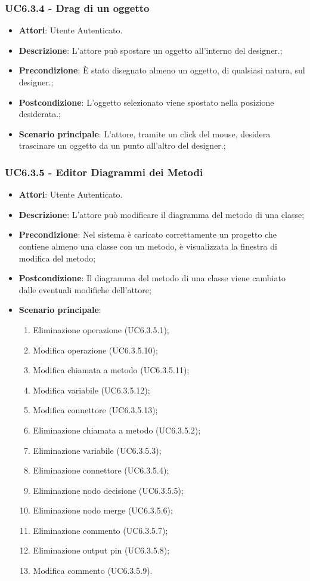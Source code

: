 \subsubsection{UC6.3.4 - Drag di un oggetto} 
\label{sssec:UC6.3.4} 
\begin{itemize} 
\item \textbf{Attori}: Utente Autenticato.
\item \textbf{Descrizione}: L'attore può spostare un oggetto all'interno del designer.;
\item \textbf{Precondizione}: È stato disegnato almeno un oggetto, di qualsiasi natura, sul designer.;
\item \textbf{Postcondizione}: L'oggetto selezionato viene spostato nella posizione desiderata.;
\item \textbf{Scenario principale}: L'attore, tramite un click del mouse, desidera trascinare un oggetto da un punto all'altro del designer.;\end{itemize} 
\subsubsection{UC6.3.5 - Editor Diagrammi dei Metodi} 
\label{sssec:UC6.3.5} 
\begin{itemize} 
\item \textbf{Attori}: Utente Autenticato.
\item \textbf{Descrizione}: L'attore può modificare il diagramma del metodo di una classe;
\item \textbf{Precondizione}: Nel sistema è caricato correttamente un progetto che  contiene almeno una classe con un metodo, è visualizzata la finestra di modifica del metodo;
\item \textbf{Postcondizione}: Il diagramma del metodo di una classe viene cambiato dalle eventuali modifiche dell'attore;
\item \textbf{Scenario principale}: \begin{enumerate}\item Eliminazione operazione (UC6.3.5.1);\item Modifica operazione (UC6.3.5.10);\item Modifica chiamata a metodo (UC6.3.5.11);\item Modifica variabile (UC6.3.5.12);\item Modifica connettore (UC6.3.5.13);\item Eliminazione chiamata a metodo (UC6.3.5.2);\item Eliminazione variabile (UC6.3.5.3);\item Eliminazione connettore (UC6.3.5.4);\item Eliminazione nodo decisione (UC6.3.5.5);\item Eliminazione nodo merge (UC6.3.5.6);\item Eliminazione commento (UC6.3.5.7);\item Eliminazione output pin (UC6.3.5.8);\item Modifica commento (UC6.3.5.9). 
 \end{enumerate}
\end{itemize} 
